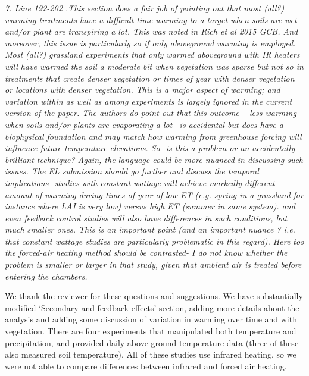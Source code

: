 \documentclass[11pt,a4paper]{letter}
\begin{document}
\par \emph{7. Line 192-202 .This section does a fair job of pointing out that most (all?) warming treatments have a difficult time warming to a target when soils are wet and/or plant are transpiring a lot. This was noted in Rich et al 2015 GCB. And moreover, this issue is particularly so if only aboveground warming is employed. Most (all?) grassland experiments that only warmed aboveground with IR heaters will have warmed the soil a moderate bit when vegetation was sparse but not so in treatments that create denser vegetation or times of year with denser vegetation or locations with denser vegetation. This is a major aspect of warming; and variation within as well as among experiments is largely ignored in the current version of the paper. The authors do point out that this outcome -- less warming when soils and/or plants are evaporating a lot-- is accidental but does have a biophysical foundation and may match how warming from greenhouse forcing will influence future temperature elevations. So -is this a problem or an accidentally brilliant technique? Again, the language could be more nuanced in discussing such issues. The EL submission should go further and discuss the temporal implications- studies with constant wattage will achieve markedly different amount of warming during times of year of low ET (e.g. spring in a grassland for instance where LAI is very low) versus high ET (summer in same system). and even feedback control studies will also have differences in such conditions, but much smaller ones. This is an important point (and an important nuance ? i.e. that constant wattage studies are particularly problematic in this regard). Here too the forced-air heating method should be contrasted- I do not know whether the problem is smaller or larger in that study, given that ambient air is treated before entering the chambers.}
\par We thank the reviewer for these questions and suggestions. We have substantially modified `Secondary and feedback effects' section, adding more details about the analysis and adding some discussion of variation in warming over time and with vegetation. There are four experiments that manipulated both temperature and precipitation, and provided daily above-ground temperature data (three of these also measured soil temperature). All of these studies use infrared heating, so we were not able to compare differences  between infrared and forced air heating.
\\
\end{document}
